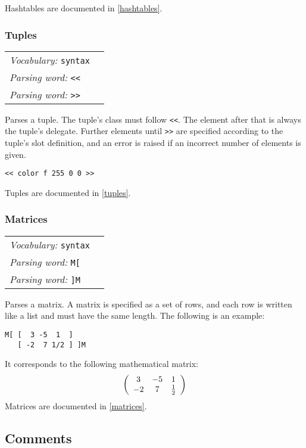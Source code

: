 \documentclass{book}
\newcommand{\vocabulary}[1]{\emph{Vocabulary:} \texttt{#1}&\\}
\newcommand{\parsingword}[2]{\index{\texttt{#1}}\emph{Parsing word:} \texttt{#2}&\\}
\newcommand{\wordtable}[1]{


\begin{tabularx}{12cm}{lX}
\hline
#1
\hline
\end{tabularx}

}
\begin{document}
Hashtables are documented in \ref{hashtables}.

\subsubsection{Tuples}
\newcommand{\tupleglos}{}
\tupleglos
\wordtable{
\vocabulary{syntax}
\parsingword{<<}{<<}
\parsingword{>>}{>>}
}
Parses a tuple. The tuple's class must follow \texttt{<<}. The element after that is always the tuple's delegate. Further elements until \texttt{>>} are specified according to the tuple's slot definition, and an error is raised if an incorrect number of elements is given.
\begin{verbatim}
<< color f 255 0 0 >>
\end{verbatim}

Tuples are documented in \ref{tuples}.

\subsubsection{Matrices}\label{syntax:matrices}
\newcommand{\matrixglos}{}
\matrixglos
\wordtable{
\vocabulary{syntax}
\parsingword{M[}{M[}
\parsingword{]M}{]M}
}
Parses a matrix. A matrix is specified as a set of rows, and each row is written like a list and must have the same length. The following is an example:
\begin{verbatim}
M[ [  3 -5  1  ]
   [ -2  7 1/2 ] ]M
\end{verbatim}
It corresponds to the following mathematical matrix:
$$\left( \begin{array}{c c c}
3 & -5 & 1 \\
-2 & 7 & \frac{1}{2}
\end{array} \right)$$
Matrices are documented in \ref{matrices}.

\subsection{Comments}\label{comments}
\end{document}
